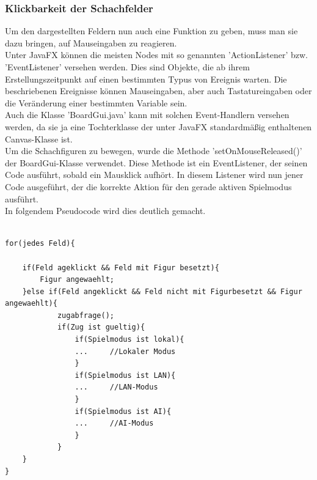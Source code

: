 \documentclass[12pt,a4paper]{article}
\begin{document}
\subsubsection{Klickbarkeit der Schachfelder}
\label{SUBSUBSECTION:CLICKABLE}
Um den dargestellten Feldern nun auch eine Funktion zu geben, muss man sie dazu bringen, auf Mauseingaben zu reagieren. \\
Unter JavaFX können die meisten Nodes mit so genannten 'ActionListener' bzw. 'EventListener' versehen werden. Dies sind Objekte, die ab ihrem Erstellungszeitpunkt auf einen bestimmten Typus von Ereignis warten. Die beschriebenen Ereignisse können Mauseingaben, aber auch Tastatureingaben oder die Veränderung einer bestimmten Variable sein. \\
Auch die Klasse 'BoardGui.java' kann mit solchen Event-Handlern versehen werden, da sie ja eine Tochterklasse der unter JavaFX standardmäßig enthaltenen Canvas-Klasse ist.\\
Um die Schachfiguren zu bewegen, wurde die Methode 'setOnMouseReleased()' der BoardGui-Klasse verwendet. Diese Methode ist ein EventListener, der seinen Code ausführt, sobald ein Mausklick aufhört.
In diesem Listener wird nun jener Code ausgeführt, der die korrekte Aktion für den gerade aktiven Spielmodus ausführt. \\
In folgendem Pseudocode wird dies deutlich gemacht.

\lstset{language=java}
\begin{lstlisting}

for(jedes Feld){

	if(Feld ageklickt && Feld mit Figur besetzt){
		Figur angewaehlt;
	}else if(Feld angeklickt && Feld nicht mit Figurbesetzt && Figur angewaehlt){
			zugabfrage();
			if(Zug ist gueltig){
				if(Spielmodus ist lokal){
				... 	//Lokaler Modus
				}
				if(Spielmodus ist LAN){
				...		//LAN-Modus
				}
				if(Spielmodus ist AI){
				...		//AI-Modus
				}
			}	
	}
}

\end{lstlisting}
\end{document}
